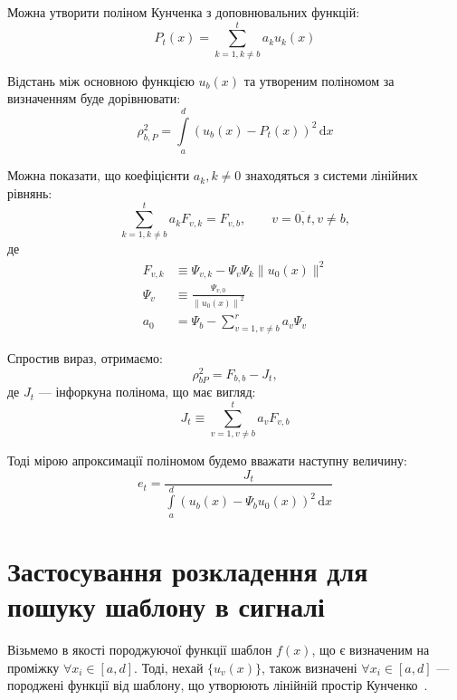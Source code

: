     Можна утворити поліном Кунченка з доповнювальних функцій:
    \begin{equation}
        \label{eq:polynom}
        P_t( x ) = \sum^t_{k = 1, k \ne b} a_k u_k( x  )
    \end{equation}

    Відстань між основною функцією $u_b(x)$ та утвореним поліномом за визначенням буде дорівнювати:
    \begin{equation}
        \rho^2_{b,P} = \int\limits_a^d\left( u_b(x) - P_t(x)\right)^2 \, \mathrm{d}x
    \end{equation}

    Можна показати, що коефіцієнти $a_k, k \ne 0$ знаходяться з системи лінійних рівнянь:
    \begin{equation}
        \label{eq:linear-system}
        \sum^t_{k=1,k\ne b} a_k F_{v,k} = F_{v,b},\qquad v=\overline{0,t}, v \ne b,
    \end{equation}
    де
    \begin{align}
        \label{eq:centered-correlants}
        F_{v,k} &\equiv \Psi_{v,k} - \Psi_v \Psi_k \| u_0( x ) \|^2\\
        \Psi_v &\equiv \frac{\Psi_{v,0}}{\left\|u_0(x)\right\|^2}\\
        a_0 &= \Psi_b - \sum\limits_{v=1, v \ne b}^r{a_v \Psi_v}
    \end{align}

    Спростив вираз, отримаємо:
    \begin{equation}
        \rho^2_{bP} = F_{b,b} - J_t,
    \end{equation}
    де $J_t$ --- інфоркуна полінома, що має вигляд:
    \begin{equation}
        J_t \equiv \sum_{v=1,v\ne b}^t a_v F_{v,b}
    \end{equation}

    Тоді мірою апроксимації поліномом будемо вважати наступну величину:
    \begin{equation}
        \label{eq:et}
        e_t = \frac{J_t}{\int\limits_a^d (u_b(x)-\Psi_b u_0( x ))^2\, \mathrm{d}x}
    \end{equation}

\section{Застосування розкладення для пошуку шаблону в сигналі}
    Візьмемо в якості породжуючої функції шаблон $f(x)$, що є визначеним на проміжку $\forall x_i \in {[a, d]}$.
    Тоді, нехай $\{u_v(x)\}$, також визначені $\forall x_i \in {[a, d]}$ --- породжені функції від шаблону, що
    утворюють лінійній простір Кунченко~\cite{book7}.

